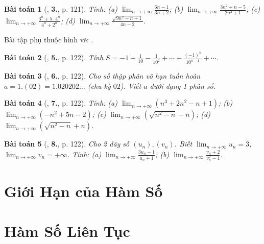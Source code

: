 \documentclass{article}
\numberwithin{equation}{section}
\newtheorem{baitoan}{Bài toán}
\begin{document}
\begin{baitoan}[\cite{SGK_Toan_11_dai_so_giai_tich_co_ban}, \textbf{3.}, p. 121]
	Tính: (a) $\lim_{n\to+\infty} \frac{6n - 1}{3n + 2}$; (b) $\lim_{n\to+\infty} \frac{3n^2 + n - 5}{2n^2 + 1}$; (c) $\lim_{n\to+\infty} \frac{3^n + 5\cdot4^n}{4^n + 2^n}$; (d) $\lim_{n\to+\infty} \frac{\sqrt{9n^2 - n + 1}}{4n - 2}$.
\end{baitoan}
Bài tập phụ thuộc hình vẽ: \cite[\textbf{4.}, p. 121]{SGK_Toan_11_dai_so_giai_tich_co_ban}.

\begin{baitoan}[\cite{SGK_Toan_11_dai_so_giai_tich_co_ban}, \textbf{5.}, p. 122]
	Tính $S = -1 + \frac{1}{10} - \frac{1}{10^2} + \cdots + \frac{(-1)^n}{10^{n-1}} + \cdots$.
\end{baitoan}

\begin{baitoan}[\cite{SGK_Toan_11_dai_so_giai_tich_co_ban}, \textbf{6.}, p. 122]
	Cho số thập phân vô hạn tuần hoàn $a = 1.(02) = 1.020202\ldots$ (chu kỳ $02$). Viết $a$ dưới dạng 1 phân số.
\end{baitoan}

\begin{baitoan}[\cite{SGK_Toan_11_dai_so_giai_tich_co_ban}, \textbf{7.}, p. 122]
	Tính: (a) $\lim_{n\to+\infty} (n^3 + 2n^2 - n + 1)$; (b) $\lim_{n\to+\infty} (-n^2 + 5n - 2)$; (c) $\lim_{n\to+\infty} \left(\sqrt{n^2 - n} - n\right)$; (d) $\lim_{n\to+\infty} \left(\sqrt{n^2 - n} + n\right)$.
\end{baitoan}

\begin{baitoan}[\cite{SGK_Toan_11_dai_so_giai_tich_co_ban}, \textbf{8.}, p. 122]
	Cho 2 dãy số $(u_n),(v_n)$. Biết $\lim_{n\to+\infty} u_n = 3$, $\lim_{n\to+\infty} v_n = +\infty$. Tính: (a) $\lim_{n\to+\infty} \frac{3u_n - 1}{u_n + 1}$; (b) $\lim_{n\to+\infty} \frac{v_n + 2}{v_n^2 - 1}$.
\end{baitoan}


\section{Giới Hạn của Hàm Số}


\section{Hàm Số Liên Tục}


\printbibliography[heading=bibintoc]
	
\end{document}
